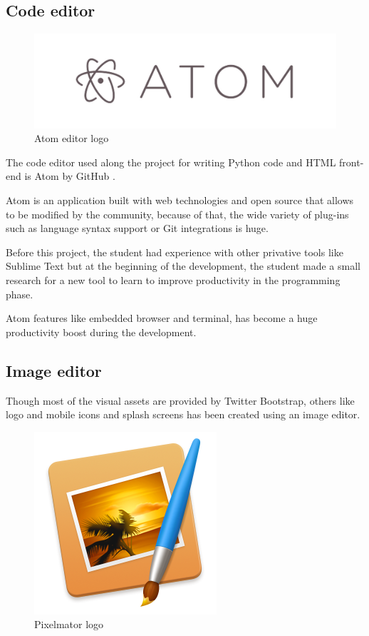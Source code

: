 \documentclass{DeustoFDP}
\begin{document}
\subsection{Code editor}
\begin{figure}[h]
\centering
\includegraphics[width=0.7\linewidth]{fig/atom}
\caption[Atom editor logo]{Atom editor logo}
\label{fig:atom}
\end{figure}

The code editor used along the project for writing Python code and HTML front-end is Atom by GitHub \cite{atom}.

Atom is an application built with web technologies and open source that allows to be modified by the community, because of that, the wide variety of plug-ins such as language syntax support or Git integrations is huge.

Before this project, the student had experience with other privative tools like Sublime Text but at the beginning of the development, the student made a small research for a new tool to learn to improve productivity in the programming phase.

Atom features like embedded browser and terminal, has become a huge productivity boost during the development.
\subsection{Image editor}
Though most of the visual assets are provided by Twitter Bootstrap, others like logo and mobile icons and splash screens has been created using an image editor.

\begin{figure}[h]
\centering
\includegraphics[width=0.3\linewidth]{fig/pixelmator}
\caption[Pixelmator logo]{Pixelmator logo}
\label{fig:pixelmator}
\end{figure}
\end{document}
